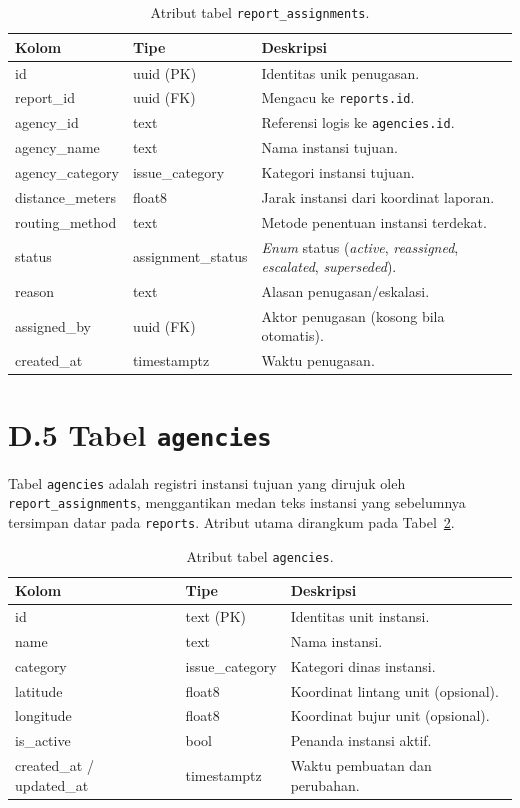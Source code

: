 \begin{table}[htbp]
\centering
\caption{Atribut tabel \texttt{report\_assignments}.}
\label{tab:report-assignments}
\small
\begin{tabular}{p{3.4cm} p{2.6cm} p{6.5cm}}
\toprule
\textbf{Kolom} & \textbf{Tipe} & \textbf{Deskripsi} \\
\midrule
id & uuid (PK) & Identitas unik penugasan. \\
report\_id & uuid (FK) & Mengacu ke \texttt{reports.id}. \\
agency\_id & text & Referensi logis ke \texttt{agencies.id}. \\
agency\_name & text & Nama instansi tujuan. \\
agency\_category & issue\_category & Kategori instansi tujuan. \\
distance\_meters & float8 & Jarak instansi dari koordinat laporan. \\
routing\_method & text & Metode penentuan instansi terdekat. \\
status & assignment\_status & \textit{Enum} status (\textit{active}, \textit{reassigned}, \textit{escalated}, \textit{superseded}). \\
reason & text & Alasan penugasan/eskalasi. \\
assigned\_by & uuid (FK) & Aktor penugasan (kosong bila otomatis). \\
created\_at & timestamptz & Waktu penugasan. \\
\bottomrule
\end{tabular}
\end{table}

\section*{D.5 Tabel \texttt{agencies}}

Tabel \texttt{agencies} adalah registri instansi tujuan yang dirujuk oleh \texttt{report\_assignments}, menggantikan medan teks instansi yang sebelumnya tersimpan datar pada \texttt{reports}. Atribut utama dirangkum pada Tabel~\ref{tab:agencies}.

\begin{table}[htbp]
\centering
\caption{Atribut tabel \texttt{agencies}.}
\label{tab:agencies}
\small
\begin{tabular}{p{3.4cm} p{2.6cm} p{6.5cm}}
\toprule
\textbf{Kolom} & \textbf{Tipe} & \textbf{Deskripsi} \\
\midrule
id & text (PK) & Identitas unit instansi. \\
name & text & Nama instansi. \\
category & issue\_category & Kategori dinas instansi. \\
latitude & float8 & Koordinat lintang unit (opsional). \\
longitude & float8 & Koordinat bujur unit (opsional). \\
is\_active & bool & Penanda instansi aktif. \\
created\_at / updated\_at & timestamptz & Waktu pembuatan dan perubahan. \\
\bottomrule
\end{tabular}
\end{table}

